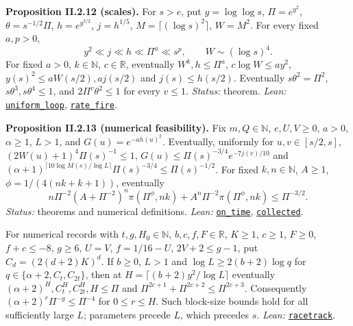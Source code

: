 \documentclass[
  letterpaper,
  11pt]{article}
\begin{document}
\textbf{Proposition II.2.12 (scales).} For \(s>e\), put
\(y=\log\log s\), \(\Pi=e^{y^2}\), \(\theta=s^{-1/2}\Pi\),
\(h=e^{y^{3/2}}\), \(j=h^{1/5}\), \(M=\lceil(\log s)^2\rceil\),
\(W=M^2\). For every fixed \(a,p>0\),
\[y^2\ll j\ll h\ll\Pi^a\ll s^p,\qquad W\sim(\log s)^4.\] For fixed
\(a>0\), \(k\in\mathbb N\), \(c\in\mathbb R\), eventually
\(W^k,h\le\Pi^a\), \(c\log W\le ay^2\), \(y(s)^2\le aW(s/2),aj(s/2)\)
and \(j(s)\le h(s/2)\). Eventually \(s\theta^2=\Pi^2\),
\(s\theta^3,s\theta^4\le1\), and \(2\Pi^v\theta^2\le1\) for every
\(v\le1\). \emph{Status:} theorem. \emph{Lean:}
\href{https://github.com/yang-mills-group/OpenAI-YM-20261028/blob/3456e5e75cf8d4cd558955a5c7638fba2d68f464/YM/Vac/Treasury.lean\#L83-L108}{\texttt{uniform\_loop}},
\href{https://github.com/yang-mills-group/OpenAI-YM-20261028/blob/3456e5e75cf8d4cd558955a5c7638fba2d68f464/YM/Next/RANK/Reign.lean\#L110-L122}{\texttt{rate\_fire}}.

\textbf{Proposition II.2.13 (numerical feasibility).} Fix
\(m,Q\in\mathbb N\), \(e,U,V\ge0\), \(a>0\), \(\alpha\ge1\), \(L>1\),
and \(G(u)=e^{-ah(u)^2}\). Eventually, uniformly for \(u,v\in[s/2,s]\),
\((2W(u)+1)^4\Pi(s)^{-1}\le1\), \(G(u)\le\Pi(s)^{-3/4}e^{-7j(v)/10}\)
and
\((\alpha+1)^{\lceil10\log M(s)/\log L\rceil}\Pi(s)^{-3/4}\le\Pi(s)^{-1/2}\).
For fixed \(k,n\in\mathbb N\), \(A\ge1\), \(\phi=1/(4(nk+k+1))\),
eventually
\[n\Pi^{-2}(A+\Pi^{-2})^n\pi(\Pi^\phi,nk)+A^n\Pi^{-2}\pi(\Pi^\phi,nk)\le\Pi^{-3/2}.\]
\emph{Status:} theorems and numerical definitions. \emph{Lean:}
\href{https://github.com/yang-mills-group/OpenAI-YM-20261028/blob/3456e5e75cf8d4cd558955a5c7638fba2d68f464/YM/Next/RANK/Stepped.lean\#L81-L89}{\texttt{on\_time}},
\href{https://github.com/yang-mills-group/OpenAI-YM-20261028/blob/3456e5e75cf8d4cd558955a5c7638fba2d68f464/YM/Next/RANK/Planck.lean\#L39-L62}{\texttt{collected}}.

For numerical records with \(t,g,H_0\in\mathbb N\),
\(b,c,f,F\in\mathbb R\), \(K\ge1\), \(c\ge1\), \(F\ge0\), \(f+c\le-8\),
\(g\ge6\), \(U=V\), \(f=1/16-U\), \(2V+2\le g-1\), put
\(C_d=(2(d+2)K)^d\). If \(b\ge0\), \(L>1\) and \(\log L\ge2(b+2)\log q\)
for \(q\in\{\alpha+2,C_t,C_{2t}\}\), then at
\(H=\lceil(b+2)y^2/\log L\rceil\) eventually
\((\alpha+2)^H,C_t^H,C_{2t}^H,H\le\Pi\) and
\(\Pi^{2c+1}+\Pi^{2c+2}\le\Pi^{2c+3}\). Consequently
\((\alpha+2)^r\Pi^{-g}\le\Pi^{-4}\) for \(0\le r\le H\). Such block-size
bounds hold for all sufficiently large \(L\); parameters precede \(L\),
which precedes \(s\). \emph{Lean:}
\href{https://github.com/yang-mills-group/OpenAI-YM-20261028/blob/3456e5e75cf8d4cd558955a5c7638fba2d68f464/YM/Next/RANK/Odometer.lean\#L56-L61}{\texttt{racetrack}}.
\end{document}
